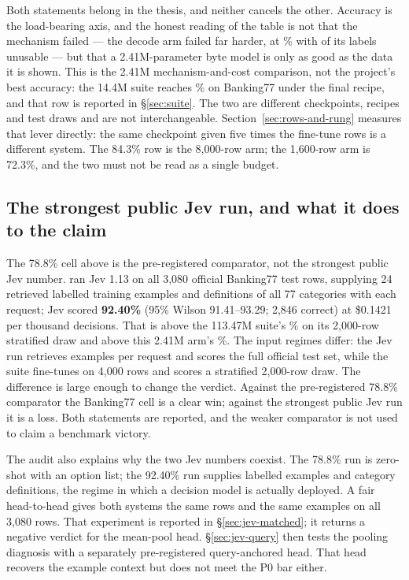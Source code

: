 Both statements belong in the thesis, and neither cancels the other. Accuracy
is the load-bearing axis, and the honest reading of the table is not that the
mechanism failed --- the decode arm failed far harder, at \CmpBankDecodePct\%
with \CmpBankInvalid{} of its labels unusable --- but that a 2.41M-parameter
byte model is only as good as the data it is shown. This is the 2.41M
mechanism-and-cost comparison, not the project's best accuracy: the 14.4M suite
reaches \SuiteSmallBank\% on Banking77 under the final recipe, and that row is
reported in \S\ref{sec:suite}. The two are different checkpoints, recipes and
test draws and are not interchangeable.
Section~\ref{sec:rows-and-rung} measures that lever directly: the same
checkpoint given five times the fine-tune rows is a different system. The 84.3\%
row is the 8,000-row arm; the 1,600-row arm is 72.3\%, and the two must not be
read as a single budget.

\subsection{The strongest public Jev run, and what it does to the claim}
\label{sec:jev-strongest}

The 78.8\% cell above is the pre-registered comparator, not the strongest public
Jev number. \citet{smith2026jevbanking} ran Jev 1.13 on all 3,080 official
Banking77 test rows, supplying 24 retrieved labelled training examples and
definitions of all 77 categories with each request; Jev scored \textbf{92.40\%}
(95\% Wilson 91.41--93.29; 2,846 correct) at \$0.1421 per thousand decisions.
That is above the 113.47M suite's \SuiteLargeBank\% on its 2,000-row stratified
draw and above this 2.41M arm's \CmpBankScorePct\%. The input regimes differ:
the Jev run retrieves examples per request and scores the full official test
set, while the suite fine-tunes on 4,000 rows and scores a stratified 2,000-row
draw. The difference is large enough to change the verdict. Against the
pre-registered 78.8\% comparator the Banking77 cell is a clear win; against the
strongest public Jev run it is a loss. Both statements are reported, and the
weaker comparator is not used to claim a benchmark victory.

The audit also explains why the two Jev numbers coexist. The 78.8\% run is
zero-shot with an option list; the 92.40\% run supplies labelled examples and
category definitions, the regime in which a decision model is actually deployed.
A fair head-to-head gives both systems the same rows and the same examples on
all 3,080 rows. That experiment is reported in \S\ref{sec:jev-matched}; it
returns a negative verdict for the mean-pool head. \S\ref{sec:jev-query} then
tests the pooling diagnosis with a separately pre-registered query-anchored
head. That head recovers the example context but does not meet the P0 bar
either.

